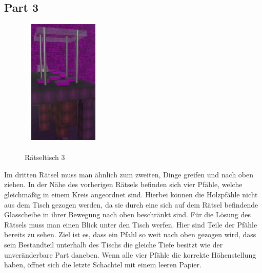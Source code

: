 \subsection{Part 3}
\begin{figure}
	\vspace*{-1cm}
	\includegraphics[width=4cm, height=6cm]{Pictures/Tisch3}
	\caption{\\ \noindent Rätseltisch 3}
	\vspace*{-1cm}
	\label{fig:tisch3}
\end{figure}
Im dritten Rätsel muss man ähnlich zum zweiten, Dinge greifen und nach oben ziehen. In der Nähe des vorherigen Rätsels befinden sich vier Pfähle, welche gleichmäßig in einem Kreis angeordnet sind. Hierbei können die Holzpfähle nicht aus dem Tisch gezogen werden, da sie durch eine sich auf dem Rätsel befindende Glasscheibe in ihrer Bewegung nach oben beschränkt sind. Für die Lösung des Rätsels muss man einen Blick unter den Tisch werfen. Hier sind Teile der Pfähle bereits zu sehen. Ziel ist es, dass ein Pfahl so weit nach oben gezogen wird, dass sein Bestandteil unterhalb des Tischs die gleiche Tiefe besitzt wie der unveränderbare Part daneben. Wenn alle vier Pfähle die korrekte Höhenstellung haben, öffnet sich die letzte Schachtel mit einem leeren Papier.
